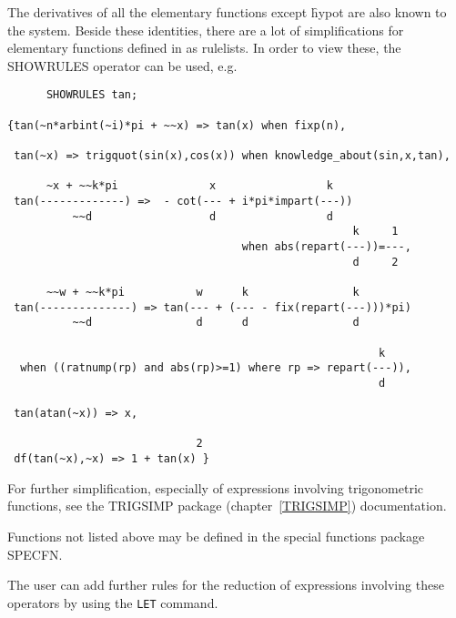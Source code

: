 The derivatives of all the elementary functions except \f{hypot} are
also known to the system.  Beside these identities, there are a lot of
simplifications for elementary functions defined in {\REDUCE} as
rulelists.  In order to view these, the SHOWRULES operator can be
used, e.g.
\begin{verbatim}
      SHOWRULES tan;

{tan(~n*arbint(~i)*pi + ~~x) => tan(x) when fixp(n),

 tan(~x) => trigquot(sin(x),cos(x)) when knowledge_about(sin,x,tan),

      ~x + ~~k*pi              x                 k
 tan(-------------) =>  - cot(--- + i*pi*impart(---))
          ~~d                  d                 d
                                                     k     1
                                    when abs(repart(---))=---,
                                                     d     2

      ~~w + ~~k*pi           w      k                k
 tan(--------------) => tan(--- + (--- - fix(repart(---)))*pi)
          ~~d                d      d                d

                                                         k
  when ((ratnump(rp) and abs(rp)>=1) where rp => repart(---)),
                                                         d

 tan(atan(~x)) => x,

                             2
 df(tan(~x),~x) => 1 + tan(x) }
\end{verbatim}

For further simplification, especially of expressions involving
trigonometric functions, see the TRIGSIMP package
(chapter~\ref{TRIGSIMP}) documentation.

Functions not listed above may be defined in the special functions
package SPECFN.

The user can add further rules for the reduction of expressions involving
these operators by using the \texttt{LET} command.


